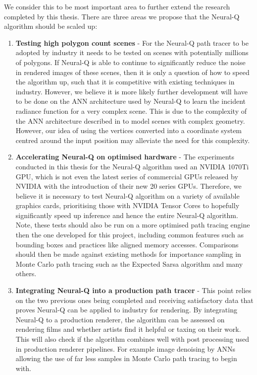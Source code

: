 \documentclass[../dissertation.tex]{subfiles}
\begin{document}
We consider this to be most important area to further extend the research completed by this thesis. There are three areas we propose that the Neural-Q algorithm should be scaled up:

\begin{enumerate}
\item \textbf{Testing high polygon count scenes} - For the Neural-Q path tracer to be adopted by industry it needs to be tested on scenes with potentially millions of polygons. If Neural-Q is able to continue to significantly reduce the noise in rendered images of these scenes, then it is only a question of how to speed the algorithm up, such that it is competitive with existing techniques in industry. However, we believe it is more likely further development will have to be done on the ANN architecture used by Neural-Q to learn the incident radiance function for a very complex scene. This is due to the complexity of the ANN architecture described in \cite{} to model scenes with complex geometry. However, our idea of using the vertices converted into a coordinate system centred around the input position may alleviate the need for this complexity.

\item \textbf{Accelerating Neural-Q on optimised hardware} - The experiments conducted in this thesis for the Neural-Q algorithm used an NVIDIA 1070Ti GPU, which is not even the latest series of commercial GPUs released by NVIDIA with the introduction of their new 20 series GPUs. Therefore, we believe it is necessary to test Neural-Q algorithm on a variety of available graphics cards, prioritising those with NVIDIA Tensor Cores to hopefully significantly speed up inference and hence the entire Neural-Q algorithm. Note, these tests should also be run on a more optimised path tracing engine then the one developed for this project, including common features such as bounding boxes and practices like aligned memory accesses. Comparisons should then be made against existing methods for importance sampling in Monte Carlo path tracing such as the Expected Sarsa algorithm and many others.

\item \textbf{Integrating Neural-Q into a production path tracer} - This point relies on the two previous ones being completed and receiving satisfactory data that proves Neural-Q can be applied to industry for rendering. By integrating Neural-Q to a production renderer, the algorithm can be assessed on rendering films and whether artists find it helpful or taxing on their work. This will also check if the algorithm combines well with post processing used in production renderer pipelines. For example image denoising by ANNs allowing the use of far less samples in Monte Carlo path tracing to begin with.
\end{enumerate}
\end{document}
